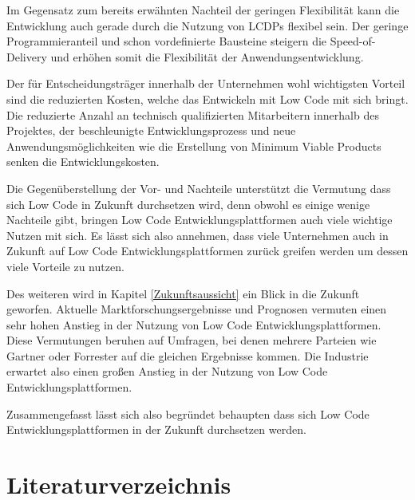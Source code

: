 \documentclass[12pt]{article} %
\begin{document}
	Im Gegensatz zum bereits erwähnten Nachteil der geringen Flexibilität kann die Entwicklung auch gerade durch die Nutzung von LCDPs flexibel sein. Der geringe Programmieranteil und schon vordefinierte Bausteine steigern die Speed-of-Delivery und erhöhen somit die Flexibilität der Anwendungsentwicklung. 
	
	Der für Entscheidungsträger innerhalb der Unternehmen wohl wichtigsten Vorteil sind die reduzierten Kosten, welche das Entwickeln mit Low Code mit sich bringt. Die reduzierte Anzahl an technisch qualifizierten Mitarbeitern innerhalb des Projektes, der beschleunigte Entwicklungsprozess und neue Anwendungsmöglichkeiten wie die Erstellung von Minimum Viable Products senken die Entwicklungskosten. \newline
	
	Die Gegenüberstellung der Vor- und Nachteile unterstützt die Vermutung dass sich Low Code in Zukunft durchsetzen wird, denn obwohl es einige wenige Nachteile gibt, bringen Low Code Entwicklungsplattformen auch viele wichtige Nutzen mit sich. Es lässt sich also annehmen, dass viele Unternehmen auch in Zukunft auf Low Code Entwicklungsplattformen zurück greifen werden um dessen viele Vorteile zu nutzen. \newline	
	
	Des weiteren wird in Kapitel \ref{Zukunftsaussicht} ein Blick in die Zukunft geworfen. Aktuelle Marktforschungsergebnisse und Prognosen vermuten einen sehr hohen Anstieg in der Nutzung von Low Code Entwicklungsplattformen. Diese Vermutungen beruhen auf Umfragen, bei denen mehrere Parteien wie Gartner oder Forrester auf die gleichen Ergebnisse kommen. Die Industrie erwartet also einen großen Anstieg in der Nutzung von Low Code Entwicklungsplattformen. \newline
	
	Zusammengefasst lässt sich also begründet behaupten dass sich Low Code Entwicklungsplattformen in der Zukunft durchsetzen werden. 	
	
	\newpage
	\section{Literaturverzeichnis}	
	\printbibliography[heading=none]
\end{document}
